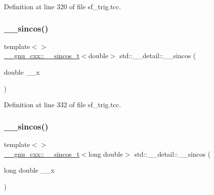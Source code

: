 Definition at line 320 of file sf\+\_\+trig.\+tcc.

\mbox{\label{namespacestd_1_1____detail_a76c185b3a0156ecf557afdbf552a8916}} 
\subsubsection{\texorpdfstring{\+\_\+\+\_\+sincos()}{\_\_sincos()}\hspace{0.1cm}{\footnotesize\ttfamily [3/4]}}
{\footnotesize\ttfamily template$<$$>$ \\
\hyperlink{struct____gnu__cxx_1_1____sincos__t}{\+\_\+\+\_\+gnu\+\_\+cxx\+::\+\_\+\+\_\+sincos\+\_\+t}$<$double$>$ std\+::\+\_\+\+\_\+detail\+::\+\_\+\+\_\+sincos (\begin{DoxyParamCaption}\item[{double}]{\+\_\+\+\_\+x }\end{DoxyParamCaption})\hspace{0.3cm}{\ttfamily [inline]}}



Definition at line 332 of file sf\+\_\+trig.\+tcc.

\mbox{\label{namespacestd_1_1____detail_aade98e6318f4459f37e1f79f4c871cf6}} 
\subsubsection{\texorpdfstring{\+\_\+\+\_\+sincos()}{\_\_sincos()}\hspace{0.1cm}{\footnotesize\ttfamily [4/4]}}
{\footnotesize\ttfamily template$<$$>$ \\
\hyperlink{struct____gnu__cxx_1_1____sincos__t}{\+\_\+\+\_\+gnu\+\_\+cxx\+::\+\_\+\+\_\+sincos\+\_\+t}$<$long double$>$ std\+::\+\_\+\+\_\+detail\+::\+\_\+\+\_\+sincos (\begin{DoxyParamCaption}\item[{long double}]{\+\_\+\+\_\+x }\end{DoxyParamCaption})\hspace{0.3cm}{\ttfamily [inline]}}



